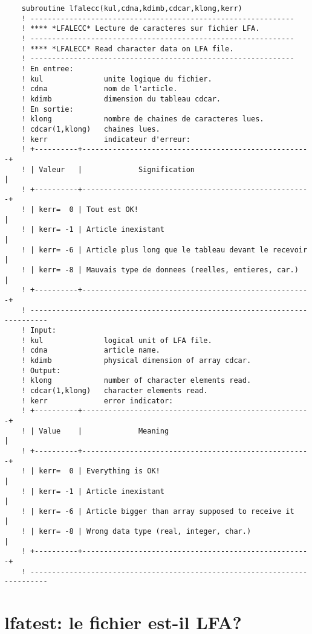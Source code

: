 \documentclass[10pt,french]{book}
\begin{document}
 
\begin{verbatim}
	subroutine lfalecc(kul,cdna,kdimb,cdcar,klong,kerr)
	! -------------------------------------------------------------                
	! **** *LFALECC* Lecture de caracteres sur fichier LFA.
	! -------------------------------------------------------------                
	! **** *LFALECC* Read character data on LFA file.
	! -------------------------------------------------------------                
	! En entree:
	! kul              unite logique du fichier.
	! cdna             nom de l'article.
	! kdimb            dimension du tableau cdcar.
	! En sortie:
	! klong            nombre de chaines de caracteres lues.
	! cdcar(1,klong)   chaines lues.
	! kerr             indicateur d'erreur:
	! +----------+-----------------------------------------------------+
	! | Valeur   |             Signification                           |
	! +----------+-----------------------------------------------------+
	! | kerr=  0 | Tout est OK!                                        |
	! | kerr= -1 | Article inexistant                                  |
	! | kerr= -6 | Article plus long que le tableau devant le recevoir |
	! | kerr= -8 | Mauvais type de donnees (reelles, entieres, car.)   |
	! +----------+-----------------------------------------------------+
	! --------------------------------------------------------------------------
	! Input:
	! kul              logical unit of LFA file.
	! cdna             article name.
	! kdimb            physical dimension of array cdcar.
	! Output:
	! klong            number of character elements read.
	! cdcar(1,klong)   character elements read.
	! kerr             error indicator:
	! +----------+-----------------------------------------------------+
	! | Value    |             Meaning                                 |
	! +----------+-----------------------------------------------------+
	! | kerr=  0 | Everything is OK!                                   |
	! | kerr= -1 | Article inexistant                                  |
	! | kerr= -6 | Article bigger than array supposed to receive it    |
	! | kerr= -8 | Wrong data type (real, integer, char.)              |
	! +----------+-----------------------------------------------------+
	! --------------------------------------------------------------------------
\end{verbatim}
\section{lfatest: le fichier est-il LFA?}
 
\end{document}
